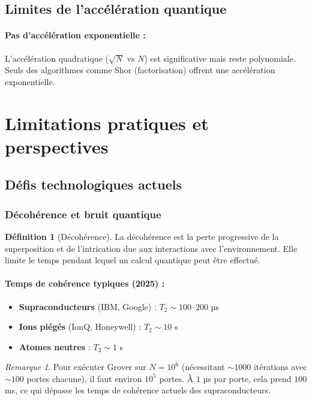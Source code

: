 \documentclass[12pt,a4paper]{article}
\theoremstyle{definition}
\newtheorem{definition}[theorem]{Définition}
\theoremstyle{remark}
\newtheorem{remark}[theorem]{Remarque}
\begin{document}
\subsection{Limites de l'accélération quantique}

\paragraph{Pas d'accélération exponentielle :}
L'accélération quadratique ($\sqrt{N}$ vs $N$) est significative mais reste polynomiale. Seuls des algorithmes comme Shor (factorisation) offrent une accélération exponentielle.

\newpage

\section{Limitations pratiques et perspectives}

\subsection{Défis technologiques actuels}

\subsubsection{Décohérence et bruit quantique}

\begin{definition}[Décohérence]
La décohérence est la perte progressive de la superposition et de l'intrication due aux interactions avec l'environnement. Elle limite le temps pendant lequel un calcul quantique peut être effectué.
\end{definition}

\paragraph{Temps de cohérence typiques (2025) :}
\begin{itemize}
    \item \textbf{Supraconducteurs} (IBM, Google) : $T_2 \sim 100\text{--}200$ µs
    \item \textbf{Ions piégés} (IonQ, Honeywell) : $T_2 \sim 10$ s
    \item \textbf{Atomes neutres} : $T_2 \sim 1$ s
\end{itemize}

\begin{remark}
Pour exécuter Grover sur $N = 10^6$ (nécessitant $\sim 1000$ itérations avec $\sim 100$ portes chacune), il faut environ $10^5$ portes. À $1$ µs par porte, cela prend $100$ ms, ce qui dépasse les temps de cohérence actuels des supraconducteurs.
\end{remark}
\end{document}
